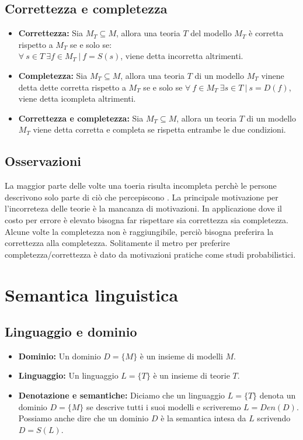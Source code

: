 \documentclass[../main.tex]{subfiles}
\newcommand{\spazio}{\vspace{1em} \newline}
\begin{document}
    \subsection{Correttezza e completezza}
    \begin{itemize}
        \item \textbf{Correttezza:} Sia $M_T \subseteq M$, allora una teoria $T$ del modello $M_T$ è corretta rispetto a $M_T$ se e solo se:\\
            $\forall\ s \in T\ \exists f \in M_T\ |\ f=S(s)$, viene detta incorretta altrimenti.
        \item \textbf{Completezza:} Sia $M_T \subseteq M$, allora una teoria $T$ di un modello $M_T$ vinene detta dette corretta rispetto a $M_T$ se e solo se $\forall\ f \in M_T\ \exists s \in T\ |\ s=D(f)$, viene detta icompleta altrimenti.
        \item \textbf{Correttezza e completezza:} Sia $M_T \subseteq M$, allora un teoria $T$ di un modello $M_T$ viene detta corretta e completa se rispetta entrambe le due condizioni.
    \end{itemize}

    \subsection{Osservazioni}
    La maggior parte delle volte una toeria risulta incompleta perchè le persone descrivono solo parte di ciò che percepiscono .
    \spazio
    La principale motivazione per l'incorreteza delle teorie è la mancanza di motivazioni.
    \spazio
    In applicazione dove il costo per errore è elevato bisogna far rispettare sia correttezza sia completezza.
    \space
    Alcune volte la completezza non è raggiungibile, perciò bisogna preferira la correttezza alla completezza.
    \space
    Solitamente il metro per preferire completezza/correttezza è dato da motivazioni pratiche come studi probabilistici.

    \section{Semantica linguistica}
    \subsection{Linguaggio e dominio}
    \begin{itemize}
        \item \textbf{Dominio:} Un dominio $D=\{M\}$ è un insieme di modelli $M$.
        \item \textbf{Linguaggio:} Un linguaggio $L=\{T\}$ è un insieme di teorie $T$.
        \item \textbf{Denotazione e semantiche:}  Diciamo che un linguaggio $L=\{T\}$ denota un dominio $D=\{M\}$ se descrive tutti i suoi modelli e scriveremo $L=Den(D)$.\\
            Possiamo anche dire che un dominio $D$ è la semantica intesa da $L$ scrivendo $D=S(L)$.
    \end{itemize}
\end{document}
